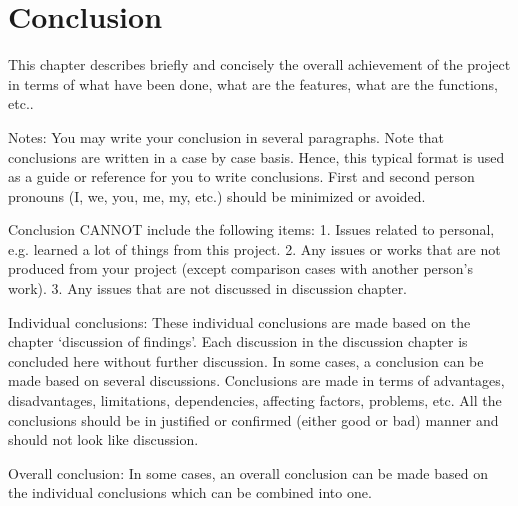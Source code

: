 \chapter{Conclusion}
This chapter describes briefly and concisely the overall achievement of the project in terms of what have been done, what are the features, what are the functions, etc..

Notes: You may write your conclusion in several paragraphs. Note that conclusions are written in a case by case basis. Hence, this typical format is used as a guide or reference for you to write conclusions. First and second person pronouns (I, we, you, me, my, etc.) should be minimized or avoided.

Conclusion CANNOT include the following items: 1. Issues related to personal, e.g. learned a lot of things from this project. 2. Any issues or works that are not produced from your project (except comparison cases with another person’s work). 3. Any issues that are not discussed in discussion chapter.

Individual conclusions: These individual conclusions are made based on the chapter ‘discussion of findings’. Each discussion in the discussion chapter is concluded here without further discussion. In some cases, a conclusion can be made based on several discussions. Conclusions are made in terms of advantages, disadvantages, limitations, dependencies, affecting factors, problems, etc. All the conclusions should be in justified or confirmed (either good or bad) manner and should not look like discussion.

Overall conclusion: In some cases, an overall conclusion can be made based on the individual conclusions which can be combined into one.
